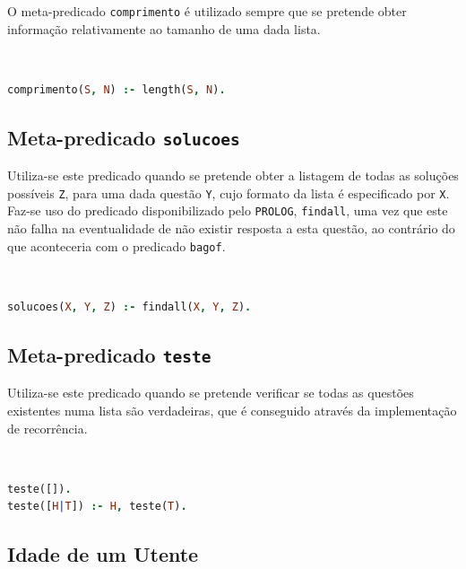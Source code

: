 \documentclass[a4paper, 11pt]{article}
\begin{document}
O meta-predicado \texttt{comprimento} é utilizado sempre que se pretende obter informação relativamente ao tamanho de
uma dada lista. 

\

\begin{lstlisting}[language=Prolog, caption={Extensão do meta-predicado \texttt{comprimento}}]
% Extensao do predicado comprimento: S, N -> {V, F}
comprimento(S, N) :- length(S, N).
\end{lstlisting}

\subsection*{Meta-predicado \texttt{solucoes}}

Utiliza-se este predicado quando se pretende obter a listagem de todas as soluções possíveis \texttt{Z}, para uma dada questão
\texttt{Y}, cujo formato da lista é especificado por \texttt{X}. Faz-se uso do predicado disponibilizado pelo \texttt{PROLOG},
\texttt{findall}, uma vez que este não falha na eventualidade de não existir resposta a esta questão, ao contrário do
que aconteceria com o predicado \texttt{bagof}.

\

\begin{lstlisting}[language=Prolog, caption={Extensão do meta-predicado \texttt{solucoes}}]
% Extensao do meta-predicado solucoes: X, Y, Z -> {V, F}
solucoes(X, Y, Z) :- findall(X, Y, Z).
\end{lstlisting}

\subsection*{Meta-predicado \texttt{teste}}

Utiliza-se este predicado quando se pretende verificar se todas as questões
existentes numa lista são verdadeiras, que é conseguido através da implementação de recorrência.

\

\begin{lstlisting}[language=Prolog, caption={Extensão do meta-predicado \texttt{teste}}]
% Extensao do meta-predicado teste: L -> {V, F}
teste([]).
teste([H|T]) :- H, teste(T).
\end{lstlisting}

\pagebreak

\subsection*{Idade de um Utente}
\end{document}
